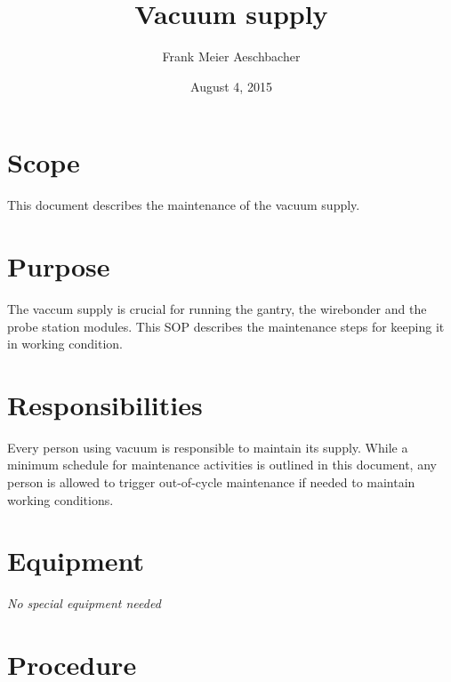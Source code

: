 \documentclass[12pt]{unlsilabsop}
\title{Vacuum supply}
\date{August 4, 2015}
\author{Frank Meier Aeschbacher}
\begin{document}
\maketitle

\section{Scope}
This document describes the maintenance of the vacuum supply.

\section{Purpose}
The vaccum supply is crucial for running the gantry, the wirebonder and the probe station modules. This SOP describes the maintenance steps for keeping it in working condition.


\section{Responsibilities}
Every person using vacuum is responsible to maintain its supply. While a minimum schedule for maintenance activities is outlined in this document, any person is allowed to trigger out-of-cycle maintenance if needed to maintain working conditions.

\section{Equipment}

\emph{No special equipment needed}


\section{Procedure}
\end{document}
